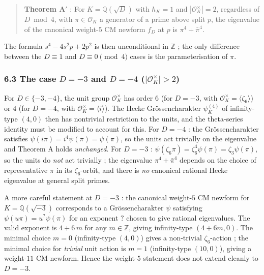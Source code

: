 \documentclass[
  11pt,
  a4paper,
]{amsart}
\begin{document}
\begin{quote}
\textbf{Theorem A}\('\) : For \(K = \mathbb{Q}(\sqrt D)\) with \(h_K = 1\) and \(|\mathcal{O}_K^\times| = 2\), regardless of \(D \bmod 4\), with \(\pi \in \mathcal{O}_K\) a generator of a prime above split \(p\), the eigenvalue of the canonical weight-\(5\) CM newform \(f_D\) at \(p\) is \(\pi^4 + \bar\pi^4\).
\end{quote}

The formula \(s^4 - 4 s^2 p + 2 p^2\) is then unconditional in \(\mathbb{Z}\) ; the only difference between the \(D \equiv 1\) and \(D \equiv 0 \pmod 4\) cases is the parameterisation of \(\pi\).

\hypertarget{the-case-d--3-and-d--4-mathcalo_ktimes-2}{%
\subsubsection{\texorpdfstring{6.3 The case \(D = -3\) and \(D = -4\) (\(|\mathcal{O}_K^\times| > 2\))}{6.3 The case D = -3 and D = -4 (\textbar\textbackslash mathcal\{O\}\_K\^{}\textbackslash times\textbar{} \textgreater{} 2)}}\label{the-case-d--3-and-d--4-mathcalo_ktimes-2}}

For \(D \in \{-3, -4\}\), the unit group \(\mathcal{O}_K^\times\) has order \(6\) (for \(D = -3\), with \(\mathcal{O}_K^\times = \langle \zeta_6 \rangle\)) or \(4\) (for \(D = -4\), with \(\mathcal{O}_K^\times = \langle i \rangle\)). The Hecke Grössencharakter \(\psi_K^{(4)}\) of infinity-type \((4, 0)\) then has nontrivial restriction to the units, and the theta-series identity must be modified to account for this. For \(D = -4\) : the Grössencharakter satisfies \(\psi(i \pi) = i^4 \psi(\pi) = \psi(\pi)\), so the units act trivially on the eigenvalue and Theorem A holds \emph{unchanged}. For \(D = -3\) : \(\psi(\zeta_6 \pi) = \zeta_6^4 \psi(\pi) = \zeta_3 \psi(\pi)\), so the units do \emph{not} act trivially ; the eigenvalue \(\pi^4 + \bar\pi^4\) depends on the choice of representative \(\pi\) in its \(\zeta_6\)-orbit, and there is \emph{no} canonical rational Hecke eigenvalue at general split primes.

A more careful statement at \(D = -3\) : the canonical weight-\(5\) CM newform for \(K = \mathbb{Q}(\sqrt{-3})\) corresponds to a Grössencharakter \(\psi\) satisfying \(\psi(u \pi) = u^? \psi(\pi)\) for an exponent \(?\) chosen to give rational eigenvalues. The valid exponent is \(4 + 6\,m\) for any \(m \in \mathbb{Z}\), giving infinity-type \((4 + 6m, 0)\). The minimal choice \(m = 0\) (infinity-type \((4, 0)\)) gives a non-trivial \(\zeta_6\)-action ; the minimal choice for \emph{trivial} unit action is \(m = 1\) (infinity-type \((10, 0)\)), giving a weight-\(11\) CM newform. Hence the weight-\(5\) statement does not extend cleanly to \(D = -3\).
\end{document}
